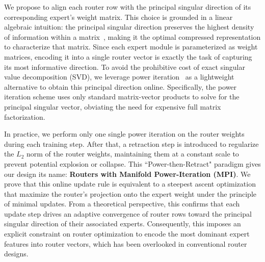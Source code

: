 \documentclass{llmxive}
\providecommand{\name}{MPI}
\begin{document}

We propose to align each router row with the principal singular direction of its corresponding expert's weight matrix. 
This choice is grounded in a linear algebraic intuition: the principal singular direction preserves the highest density of information within a matrix~\cite{matrixcomputation,power}, making it the optimal compressed representation to characterize that matrix. 
Since each expert module is parameterized as weight matrices, encoding it into a single router vector is exactly the task of capturing its most informative direction.
To avoid the prohibitive cost of exact singular value decomposition (SVD), we leverage power iteration~\cite{power} as a lightweight alternative to obtain this principal direction online.
Specifically, the power iteration scheme uses only standard matrix-vector products to solve for the principal singular vector, obviating the need for expensive full matrix factorization.

In practice, we perform only one single power iteration on the router weights during each training step.
After that, a retraction step is introduced to regularize the $L_2$ norm of the router weights, maintaining them at a constant scale to prevent potential explosion or collapse. 
This ``Power-then-Retract" paradigm gives our design its name: \textbf{Routers with Manifold Power-Iteration (\name)}.
We prove that this online update rule is equivalent to a steepest ascent optimization that maximize the router's projection onto the expert weight under the principle of minimal updates.
From a theoretical perspective, this confirms that each update step drives an adaptive convergence of router rows toward the principal singular direction of their associated experts.
Consequently, this imposes an explicit constraint on router optimization to encode the most dominant expert features into router vectors, which has been overlooked in conventional router designs.
\end{document}

